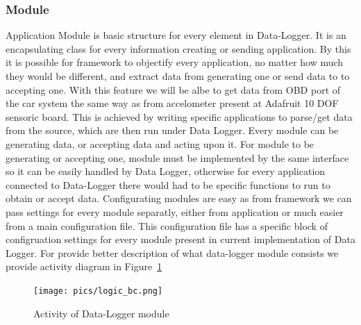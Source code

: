 \subsubsection{Module}
\label{ssub:module}
Application Module is basic structure for every element in Data-Logger. It is an encapsulating class for every information creating or sending application. By this it is possible for framework to objectify every application, no matter how much they would be different, and extract data from generating one or send data to to accepting one. With this feature we will be albe to get data from OBD port of the car system the same way as from accelometer present at Adafruit 10 DOF sensoric board. This is achieved by writing specific applications to parse/get data from the source, which are then run under Data Logger. Every module can be generating data, or accepting data and acting upon it. For module to be generating or accepting one, module must be implemented by the same interface so it can be easily handled by Data Logger, otherwise for every application connected to Data-Logger there would had to be specific functions to run to obtain or accept data. Configurating modules are easy as from framework we can pass settings for every module separatly, either from application or much easier from a main configuration file. This configuration file has a specific block of configruation settings for every module present in current implementation of Data Logger. For provide better description of what data-logger module consists we provide activity diagram in Figure~\ref{fig:activity}
\begin{figure}[H]
\begin{center}
\captionsetup{font=small}
\texttt{[image: pics/logic\_bc.png]}
\caption{Activity of Data-Logger module}
\label{fig:activity}
\end{center}
\end{figure}
